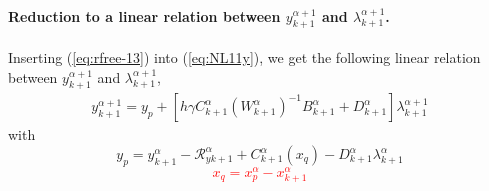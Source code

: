 \paragraph{Reduction to a linear relation between  $y^{\alpha+1}_{k+1}$ and
$\lambda^{\alpha+1}_{k+1}$.}

Inserting (\ref{eq:rfree-13}) into (\ref{eq:NL11y}), we get the following linear relation between $y^{\alpha+1}_{k+1}$ and $\lambda^{\alpha+1}_{k+1}$,
\begin{equation}
   \begin{array}{l}
     y^{\alpha+1}_{k+1} = y_p + \left[ h \gamma C^{\alpha}_{k+1} ( W^{\alpha}_{k+1})^{-1}  B^{\alpha}_{k+1} + D^{\alpha}_{k+1} \right]\lambda^{\alpha+1}_{k+1}
   \end{array}
\end{equation}
with
\begin{equation}\boxed{
    y_p = y^{\alpha}_{k+1} -\mathcal R^{\alpha}_{yk+1} + C^{\alpha}_{k+1}(x_q) -   D^{\alpha}_{k+1} \lambda^{\alpha}_{k+1} }
\end{equation}
\textcolor{red}{
  \begin{equation}
   \boxed{ x_q=x^\alpha_p -x^{\alpha}_{k+1}\label{eq:xqq}}
  \end{equation}
}












